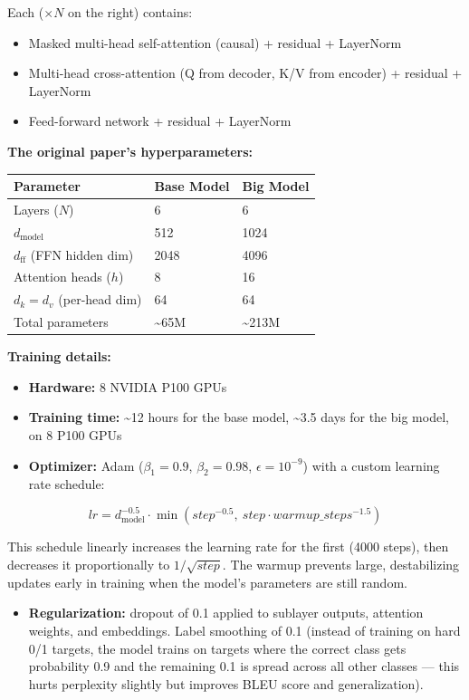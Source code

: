 Each  ($\times N$ on the right) contains:
\begin{itemize}
  \item Masked multi-head self-attention (causal) + residual + LayerNorm
  \item Multi-head cross-attention (Q from decoder, K/V from encoder) + residual + LayerNorm
  \item Feed-forward network + residual + LayerNorm
\end{itemize}

\textbf{The original paper's hyperparameters:}

\begin{center}
\begin{tabular}{lll}
\toprule
Parameter & Base Model & Big Model \\
\midrule
Layers ($N$) & 6 & 6 \\
$d_{\text{model}}$ & 512 & 1024 \\
$d_{\text{ff}}$ (FFN hidden dim) & 2048 & 4096 \\
Attention heads ($h$) & 8 & 16 \\
$d_k = d_v$ (per-head dim) & 64 & 64 \\
Total parameters & \textasciitilde{}65M & \textasciitilde{}213M \\
\bottomrule
\end{tabular}
\end{center}

\textbf{Training details:}

\begin{itemize}
  \item \textbf{Hardware:} 8 NVIDIA P100 GPUs
  \item \textbf{Training time:} \textasciitilde{}12 hours for the base model, \textasciitilde{}3.5 days for the big model, on 8 P100 GPUs
  \item \textbf{Optimizer:} Adam ($\beta_1 = 0.9$, $\beta_2 = 0.98$, $\epsilon = 10^{-9}$) with a custom learning rate schedule:
\end{itemize}

\[lr = d_{\text{model}}^{-0.5} \cdot \min(step^{-0.5}, \ step \cdot warmup\_steps^{-1.5})\]

This schedule linearly increases the learning rate for the first  (4000 steps), then decreases it proportionally to $1/\sqrt{step}$. The warmup prevents large, destabilizing updates early in training when the model's parameters are still random.

\begin{itemize}
  \item \textbf{Regularization:} dropout of 0.1 applied to sublayer outputs, attention weights, and embeddings. Label smoothing of 0.1 (instead of training on hard 0/1 targets, the model trains on targets where the correct class gets probability 0.9 and the remaining 0.1 is spread across all other classes --- this hurts perplexity slightly but improves BLEU score and generalization).
\end{itemize}

